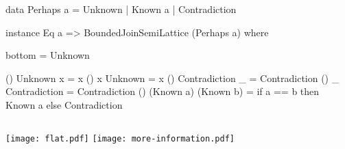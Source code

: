 
\begin{frame}[fragile]

\begin{haskellcode}
data Perhaps a = Unknown | Known a | Contradiction
\end{haskellcode}

\pnl

\begin{haskellcode}
instance Eq a => BoundedJoinSemiLattice (Perhaps a) where

  bottom = Unknown

  (\/) Unknown x           = x
  (\/) x       Unknown     = x
  (\/) Contradiction _     = Contradiction
  (\/) _     Contradiction = Contradiction
  (\/) (Known a) (Known b) =
    if a == b
      then Known a
      else Contradiction
\end{haskellcode}

\end{frame}


\begin{frame}

\begin{columns}
\texttt{[image: flat.pdf]}
\pause
{}
\texttt{[image: more-information.pdf]}
\end{columns}
\end{frame}




